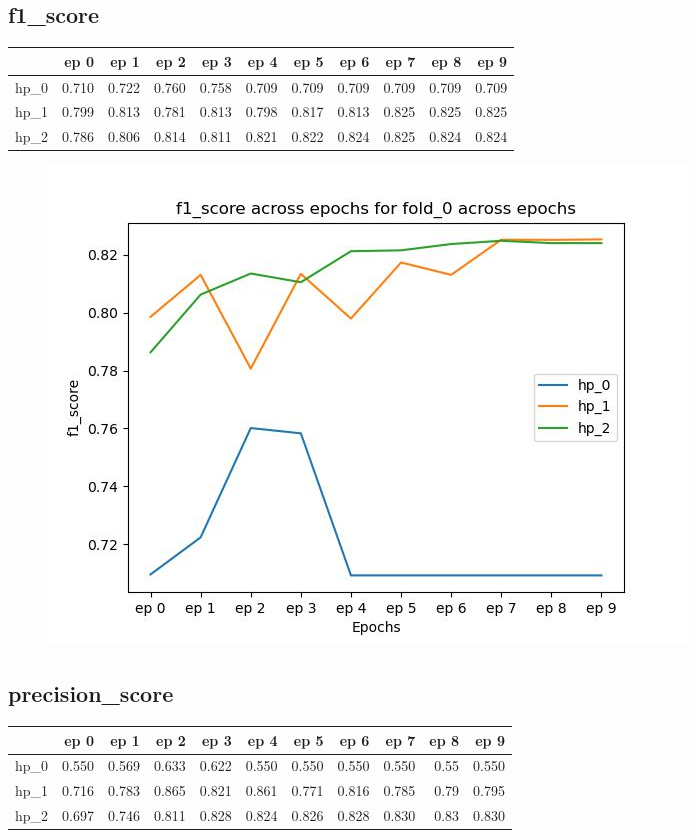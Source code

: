 \documentclass{article}
\begin{document}
\subsection{f1\_score}
\begin{tabular}{lrrrrrrrrrr}
\toprule
{} &   ep 0 &   ep 1 &   ep 2 &   ep 3 &   ep 4 &   ep 5 &   ep 6 &   ep 7 &   ep 8 &   ep 9 \\
\midrule
hp\_0 &  0.710 &  0.722 &  0.760 &  0.758 &  0.709 &  0.709 &  0.709 &  0.709 &  0.709 &  0.709 \\
hp\_1 &  0.799 &  0.813 &  0.781 &  0.813 &  0.798 &  0.817 &  0.813 &  0.825 &  0.825 &  0.825 \\
hp\_2 &  0.786 &  0.806 &  0.814 &  0.811 &  0.821 &  0.822 &  0.824 &  0.825 &  0.824 &  0.824 \\
\bottomrule
\end{tabular}

\begin{figure}[H]
\includegraphics[scale = 0.75]{fold_0/f1_score}
\end{figure}
\subsection{precision\_score}
\begin{tabular}{lrrrrrrrrrr}
\toprule
{} &   ep 0 &   ep 1 &   ep 2 &   ep 3 &   ep 4 &   ep 5 &   ep 6 &   ep 7 &  ep 8 &   ep 9 \\
\midrule
hp\_0 &  0.550 &  0.569 &  0.633 &  0.622 &  0.550 &  0.550 &  0.550 &  0.550 &  0.55 &  0.550 \\
hp\_1 &  0.716 &  0.783 &  0.865 &  0.821 &  0.861 &  0.771 &  0.816 &  0.785 &  0.79 &  0.795 \\
hp\_2 &  0.697 &  0.746 &  0.811 &  0.828 &  0.824 &  0.826 &  0.828 &  0.830 &  0.83 &  0.830 \\
\bottomrule
\end{tabular}
\end{document}
